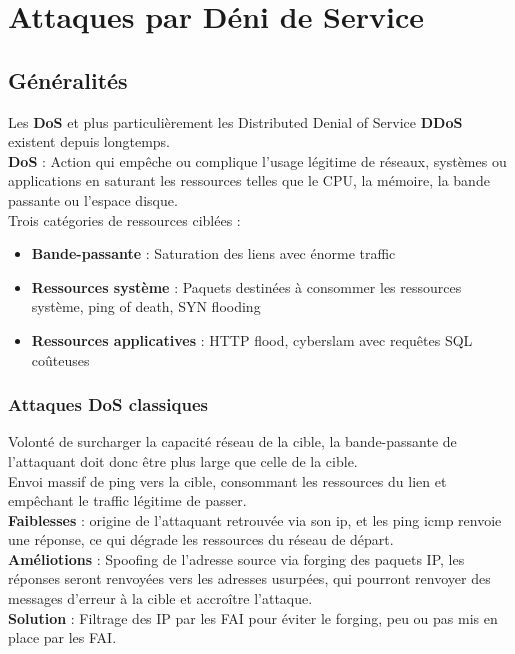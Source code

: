 \documentclass{report}
\begin{document}
\chapter{Attaques par Déni de Service}

	\section{Généralités}

		Les \textbf{DoS} et plus particulièrement les Distributed Denial of Service \textbf{DDoS} existent depuis longtemps.\\

		\textbf{DoS} : Action qui empêche ou complique l'usage légitime de réseaux, systèmes ou applications en saturant les ressources telles que le CPU, la mémoire, la bande passante ou l'espace disque.\\

		Trois catégories de ressources ciblées : \\
		\begin{itemize}
			\item \textbf{Bande-passante} : Saturation des liens avec énorme traffic
			\item \textbf{Ressources système} : Paquets destinées à consommer les ressources système, ping of death, SYN flooding
			\item \textbf{Ressources applicatives} : HTTP flood, cyberslam avec requêtes SQL coûteuses\\
		\end{itemize}

		\subsection{Attaques DoS classiques}

			Volonté de surcharger la capacité réseau de la cible, la bande-passante de l'attaquant doit donc être plus large que celle de la cible.\\
			Envoi massif de ping vers la cible, consommant les ressources du lien et empêchant le traffic légitime de passer.\\

			\textbf{Faiblesses} : origine de l'attaquant retrouvée via son ip, et les ping icmp renvoie une réponse, ce qui dégrade les ressources du réseau de départ.\\
			\textbf{Améliotions} : Spoofing de l'adresse source via forging des paquets IP, les réponses seront renvoyées vers les adresses usurpées, qui pourront renvoyer des messages d'erreur à la cible et accroître l'attaque.\\
			\textbf{Solution} : Filtrage des IP par les FAI pour éviter le forging, peu ou pas mis en place par les FAI.\\
\end{document}
